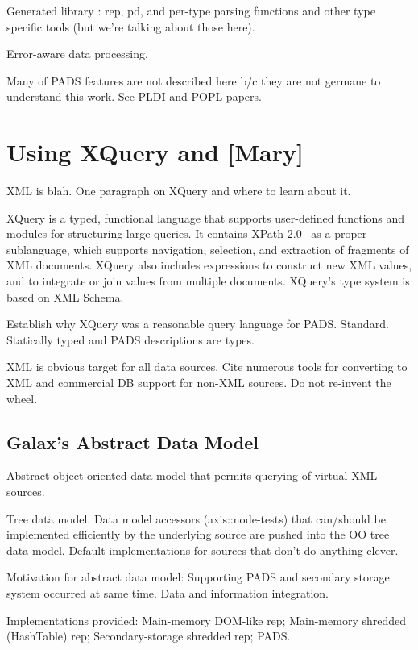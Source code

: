 \documentclass{sigplanconf}
\begin{document}
Generated library : rep, pd, and per-type parsing functions and other
type specific tools (but we're talking about those here). 

Error-aware data processing.  

Many of PADS features are not described here b/c they are not germane
to understand this work.  See PLDI and POPL papers. 

\section{Using XQuery and \Galax{}[Mary]}
\label{section:galax}

XML is blah. One paragraph on XQuery and where to learn about it.

XQuery is a typed, functional language that supports user-defined
functions and modules for structuring large queries.  It contains
XPath 2.0~\cite{xpath} as a proper sublanguage, which supports
navigation, selection, and extraction of fragments of XML documents.
XQuery also includes expressions to construct new XML values, and to
integrate or join values from multiple documents.  XQuery's type
system is based on XML Schema. 

Establish why XQuery was a reasonable query language for PADS.
Standard.  Statically typed and PADS descriptions are types.  

XML is obvious target for all data sources.  Cite numerous
tools for converting to XML and commercial DB support for non-XML
sources.  Do not re-invent the wheel.

\subsection{Galax's Abstract Data Model}

Abstract object-oriented data model that permits querying of virtual
XML sources.  

Tree data model.  Data model accessors (axis::node-tests) that can/should be implemented
efficiently by the underlying source are pushed into the OO tree data
model.  Default implementations for sources that don't do anything
clever.   

Motivation for abstract data model: Supporting PADS and secondary
storage system occurred at same time.  Data and information
integration.  

Implementations provided: Main-memory DOM-like rep; Main-memory
shredded (HashTable) rep; Secondary-storage shredded rep; PADS.
\end{document}
